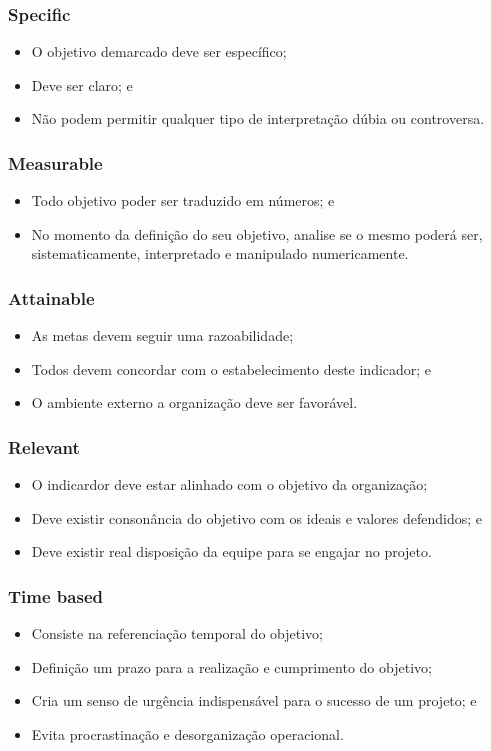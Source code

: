 \documentclass[aspectratio=169]{beamer}
\begin{document}
\begin{frame}
	\frametitle{Specific}

	\begin{itemize}
		\item O objetivo demarcado deve ser específico;
		\item Deve ser claro; e
		\item Não podem permitir qualquer tipo de interpretação dúbia ou controversa.
	\end{itemize}
\end{frame}

\begin{frame}
	\frametitle{Measurable}

	\begin{itemize}
		\item Todo objetivo poder ser traduzido em números; e
		\item No momento da definição do seu objetivo, analise se o mesmo poderá ser, sistematicamente, interpretado e manipulado numericamente.
	\end{itemize}
\end{frame}

\begin{frame}
	\frametitle{Attainable}

	\begin{itemize}
		\item As metas devem seguir uma razoabilidade;
		\item Todos devem concordar com o estabelecimento deste indicador; e
		\item O ambiente externo a organiza\c cão deve ser favorável.
	\end{itemize}
\end{frame}

\begin{frame}
	\frametitle{Relevant}

	\begin{itemize}
		\item O indicardor deve estar alinhado com o objetivo da organiza\c cão;
		\item Deve existir consonância do objetivo com os ideais e valores defendidos; e
		\item Deve existir real disposição da equipe para se engajar no projeto.
	\end{itemize}
\end{frame}

\begin{frame}
	\frametitle{Time based}

	\begin{itemize}
		\item Consiste na referenciação temporal do objetivo;
		\item Definição um prazo para a realização e cumprimento do objetivo;
		\item Cria um senso de urgência indispensável para o sucesso de um projeto; e
		\item Evita procrastinação e desorganização operacional.
	\end{itemize}
\end{frame}
\end{document}
